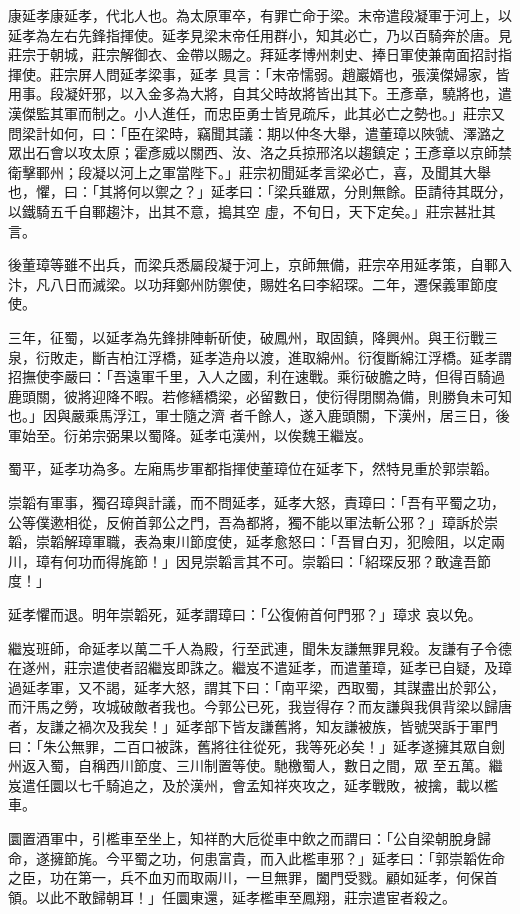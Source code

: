 \begin{pinyinscope}
 康延孝康延孝，代北人也。為太原軍卒，有罪亡命于梁。末帝遣段凝軍于河上，以延孝為左右先鋒指揮使。延孝見梁末帝任用群小，知其必亡，乃以百騎奔於唐。見莊宗于朝城，莊宗解御衣、金帶以賜之。拜延孝博州刺史、捧日軍使兼南面招討指揮使。莊宗屏人問延孝梁事，延孝
 具言：「末帝懦弱。趙巖婿也，張漢傑婦家，皆用事。段凝奸邪，以入金多為大將，自其父時故將皆出其下。王彥章，驍將也，遣漢傑監其軍而制之。小人進任，而忠臣勇士皆見疏斥，此其必亡之勢也。」莊宗又問梁計如何，曰：「臣在梁時，竊聞其議：期以仲冬大舉，遣董璋以陜虢、澤潞之眾出石會以攻太原；霍彥威以關西、汝、洛之兵掠邢洺以趨鎮定；王彥章以京師禁衛擊鄆州；段凝以河上之軍當陛下。」莊宗初聞延孝言梁必亡，喜，及聞其大舉也，懼，曰：「其將何以禦之？」延孝曰：「梁兵雖眾，分則無餘。臣請待其既分，以鐵騎五千自鄆趨汴，出其不意，搗其空
 虛，不旬日，天下定矣。」莊宗甚壯其言。



 後董璋等雖不出兵，而梁兵悉屬段凝于河上，京師無備，莊宗卒用延孝策，自鄆入汴，凡八日而滅梁。以功拜鄭州防禦使，賜姓名曰李紹琛。二年，遷保義軍節度使。



 三年，征蜀，以延孝為先鋒排陣斬斫使，破鳳州，取固鎮，降興州。與王衍戰三泉，衍敗走，斷吉柏江浮橋，延孝造舟以渡，進取綿州。衍復斷綿江浮橋。延孝謂招撫使李嚴曰：「吾遠軍千里，入人之國，利在速戰。乘衍破膽之時，但得百騎過鹿頭關，彼將迎降不暇。若修繕橋梁，必留數日，使衍得閉關為備，則勝負未可知也。」因與嚴乘馬浮江，軍士隨之濟
 者千餘人，遂入鹿頭關，下漢州，居三日，後軍始至。衍弟宗弼果以蜀降。延孝屯漢州，以俟魏王繼岌。



 蜀平，延孝功為多。左廂馬步軍都指揮使董璋位在延孝下，然特見重於郭崇韜。



 崇韜有軍事，獨召璋與計議，而不問延孝，延孝大怒，責璋曰：「吾有平蜀之功，公等僕遬相從，反俯首郭公之門，吾為都將，獨不能以軍法斬公邪？」璋訴於崇韜，崇韜解璋軍職，表為東川節度使，延孝愈怒曰：「吾冒白刃，犯險阻，以定兩川，璋有何功而得旄節！」因見崇韜言其不可。崇韜曰：「紹琛反邪？敢違吾節度！」



 延孝懼而退。明年崇韜死，延孝謂璋曰：「公復俯首何門邪？」璋求
 哀以免。



 繼岌班師，命延孝以萬二千人為殿，行至武連，聞朱友謙無罪見殺。友謙有子令德在遂州，莊宗遣使者詔繼岌即誅之。繼岌不遣延孝，而遣董璋，延孝已自疑，及璋過延孝軍，又不謁，延孝大怒，謂其下曰：「南平梁，西取蜀，其謀盡出於郭公，而汗馬之勞，攻城破敵者我也。今郭公已死，我豈得存？而友謙與我俱背梁以歸唐者，友謙之禍次及我矣！」延孝部下皆友謙舊將，知友謙被族，皆號哭訴于軍門曰：「朱公無罪，二百口被誅，舊將往往從死，我等死必矣！」延孝遂擁其眾自劍州返入蜀，自稱西川節度、三川制置等使。馳檄蜀人，數日之間，眾
 至五萬。繼岌遣任圜以七千騎追之，及於漢州，會孟知祥夾攻之，延孝戰敗，被擒，載以檻車。



 圜置酒軍中，引檻車至坐上，知祥酌大卮從車中飲之而謂曰：「公自梁朝脫身歸命，遂擁節旄。今平蜀之功，何患富貴，而入此檻車邪？」延孝曰：「郭崇韜佐命之臣，功在第一，兵不血刃而取兩川，一旦無罪，闔門受戮。顧如延孝，何保首領。以此不敢歸朝耳！」任圜東還，延孝檻車至鳳翔，莊宗遣宦者殺之。



\end{pinyinscope}